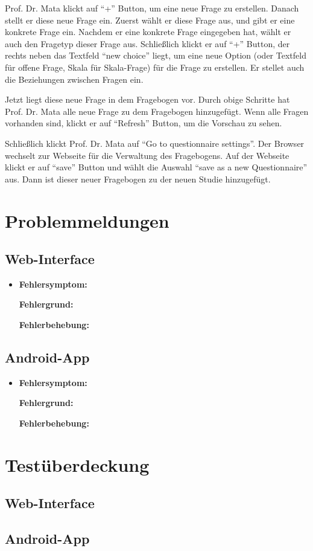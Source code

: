 \documentclass[a4paper]{scrreprt}
\begin{document}
                \par Prof. Dr. Mata klickt auf ``+'' Button, um eine neue Frage zu erstellen. Danach stellt er diese neue Frage ein. Zuerst wählt er diese Frage aus, und gibt er eine konkrete Frage ein. Nachdem er eine konkrete Frage eingegeben hat, wählt er auch den Fragetyp dieser Frage aus. Schließlich klickt er auf ``+'' Button, der rechts neben das Textfeld ``new choice'' liegt, um eine neue Option (oder Textfeld für offene Frage, Skala für Skala-Frage) für die Frage zu erstellen. Er stellet auch die Beziehungen zwischen Fragen ein.

                \par Jetzt liegt diese neue Frage in dem Fragebogen vor. Durch obige Schritte hat Prof. Dr. Mata alle neue Frage zu dem Fragebogen hinzugefügt. Wenn alle Fragen vorhanden sind, klickt er auf ``Refresh'' Button, um die Vorschau zu sehen.

                \par Schließlich klickt Prof. Dr. Mata auf ``Go to questionnaire settings''. Der Browser wechselt zur Webseite für die Verwaltung des Fragebogens. Auf der Webseite klickt er auf ``save'' Button und wählt die Auswahl ``save as a new Questionnaire'' aus. Dann ist dieser neuer Fragebogen zu der neuen Studie hinzugefügt.

	
	


      \newpage
      \chapter{Problemmeldungen}
	      \section{Web-Interface}
		
		     \begin{itemize}
		     \item \textbf{Fehlersymptom:}
		     \par \textbf{Fehlergrund:}
		     \par \textbf{Fehlerbehebung:}
		     \end{itemize}
		
		  \section{Android-App}
		
			  \begin{itemize}
				  \item \textbf{Fehlersymptom:}
				  	\par \textbf{Fehlergrund:}
			  		\par \textbf{Fehlerbehebung:}
			  \end{itemize}
			
			
		\newpage
		\chapter{Test\"uberdeckung}
			\section{Web-Interface}
			
			
			\section{Android-App}
\end{document}
